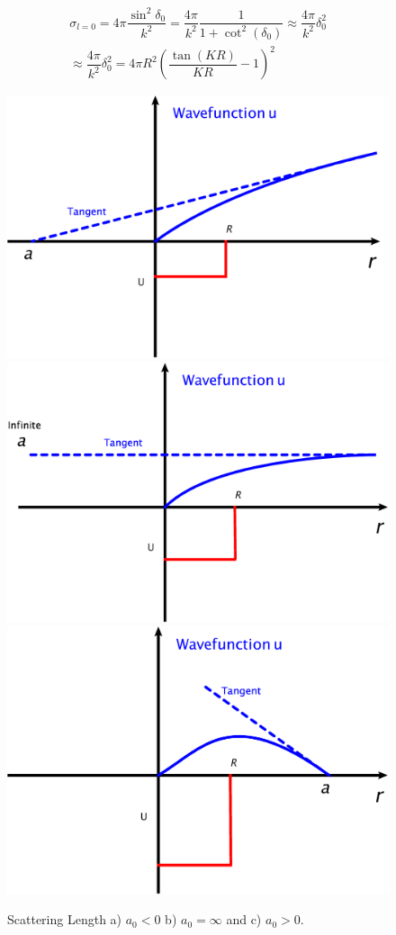 \documentclass[aps,prb,onecolumn,notitlepage,showpacs,floatfix,superscriptaddress]{revtex4-1}
\begin{document}
\begin{equation}
\begin{split}
\sigma_{l=0} = 4\pi \dfrac{\sin^2 \delta_0}{k^2} = \dfrac{4\pi}{k^2} \dfrac{1}{1+\cot^2(\delta_0)} \approx \dfrac{4\pi}{k^2} \delta_0^2 \\
\approx \dfrac{4\pi}{k^2} \delta_0^2 = 4\pi R^2 \left( \dfrac{\tan (KR)}{KR} -1 \right)^2
\end{split}
\end{equation}
\begin{figure}[hbtp]
\centering
\includegraphics[scale=0.1]{Neg_a.png} \includegraphics[scale=0.1]{Inf_a.png} \includegraphics[scale=0.1]{Pos_a.png}
\caption{Scattering Length a) $a_0 < 0$ b) $a_0 = \infty$ and c) $a_0 >0$.}
\end{figure}
\end{document}
